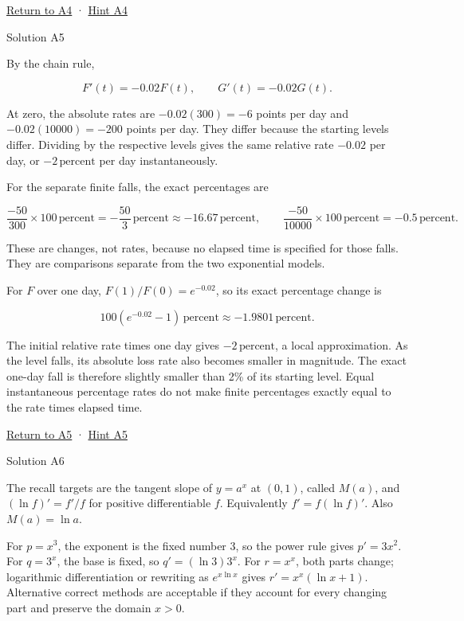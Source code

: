 \documentclass[
  11pt,
]{article}
\providecommand{\gt}{>}
\begin{document}
\protect\hyperlink{task-a4}{Return to A4} ·
\protect\hyperlink{hint-a4}{Hint A4}

Solution A5

By the chain rule,

\[
F'(t)=-0.02F(t),\qquad G'(t)=-0.02G(t).
\]

At zero, the absolute rates are \(-0.02(300)=-6\) points per day and
\(-0.02(10000)=-200\) points per day. They differ because the starting
levels differ. Dividing by the respective levels gives the same relative
rate \(-0.02\) per day, or \(-2\,\text{percent}\) per day
instantaneously.

For the separate finite falls, the exact percentages are

\[
\frac{-50}{300}\times100\,\text{percent}=-\frac{50}{3}\,\text{percent}\approx-16.67\,\text{percent},\qquad
\frac{-50}{10000}\times100\,\text{percent}=-0.5\,\text{percent}.
\]

These are changes, not rates, because no elapsed time is specified for
those falls. They are comparisons separate from the two exponential
models.

For \(F\) over one day, \(F(1)/F(0)=e^{-0.02}\), so its exact percentage
change is

\[
100(e^{-0.02}-1)\,\text{percent}\approx-1.9801\,\text{percent}.
\]

The initial relative rate times one day gives \(-2\,\text{percent}\), a
local approximation. As the level falls, its absolute loss rate also
becomes smaller in magnitude. The exact one-day fall is therefore
slightly smaller than 2\% of its starting level. Equal instantaneous
percentage rates do not make finite percentages exactly equal to the
rate times elapsed time.

\protect\hyperlink{task-a5}{Return to A5} ·
\protect\hyperlink{hint-a5}{Hint A5}

Solution A6

The recall targets are the tangent slope of \(y=a^x\) at \((0,1)\),
called \(M(a)\), and \((\ln f)'=f'/f\) for positive differentiable
\(f\). Equivalently \(f'=f(\ln f)'\). Also \(M(a)=\ln a\).

For \(p=x^3\), the exponent is the fixed number 3, so the power rule
gives \(p'=3x^2\). For \(q=3^x\), the base is fixed, so
\(q'=(\ln3)3^x\). For \(r=x^x\), both parts change; logarithmic
differentiation or rewriting as \(e^{x\ln x}\) gives
\(r'=x^x(\ln x+1)\). Alternative correct methods are acceptable if they
account for every changing part and preserve the domain \(x\gt 0\).
\end{document}
